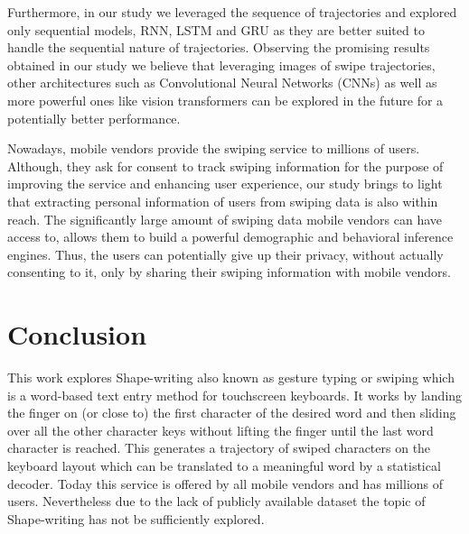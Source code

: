\documentclass[11pt,oneside,a4paper,openright]{book}
\begin{document}
Furthermore, in our study we leveraged the sequence of trajectories and explored only sequential models, RNN, LSTM and GRU as they are better suited to handle the sequential nature of trajectories. Observing the promising results obtained in our study we believe that leveraging images of swipe trajectories, other architectures such as Convolutional Neural Networks (CNNs) as well as more powerful ones like vision transformers can be explored in the future for a potentially better performance.\\\newpage

Nowadays, mobile vendors provide  the swiping service to millions of users.  Although, they ask for consent to track swiping information for the purpose of improving the service and enhancing user experience, our study brings to light that extracting personal information of users from swiping data is also within reach. The significantly large amount of swiping data mobile vendors can have access to, allows them to build a powerful demographic and behavioral inference engines. Thus, the users can potentially give up their privacy, without actually consenting to it, only by sharing their swiping information with mobile vendors. \\

\chapter{Conclusion}
This work explores Shape-writing also known as gesture typing or swiping which is a word-based text entry method for touchscreen keyboards. It works by landing the finger on (or close to) the first character of the desired word  and then sliding over all the other character keys without lifting the finger until the last word character is reached.  This generates a trajectory of swiped characters on the keyboard layout which can be translated to a meaningful word by a statistical decoder. Today this service is offered by all mobile vendors and has millions of users. Nevertheless due to the lack of publicly available dataset  the topic of Shape-writing has not be sufficiently explored. \\
\end{document}
